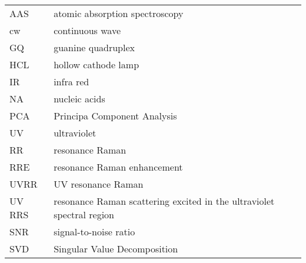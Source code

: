 

\noindent
\begin{tabularx}{\textwidth}{@{}l@{\,\dotfill\dots\,}X@{}}
AAS
	& atomic absorption spectroscopy\\
cw
	& continuous wave\\
GQ
	& guanine quadruplex\\
HCL
	& hollow cathode lamp\\
IR
	& infra red\\
NA
	& nucleic acids\\
PCA
	& Principa Component Analysis\\
UV
	& ultraviolet\\
RR
	& resonance Raman\\
RRE
	& resonance Raman enhancement\\
UVRR
	& UV resonance Raman\\
UV RRS
	& resonance Raman scattering excited in the ultraviolet spectral region\\
SNR
	& signal-to-noise ratio\\
SVD
	& Singular Value Decomposition
\end{tabularx}
